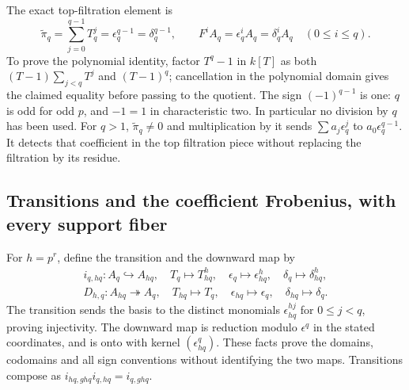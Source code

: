 The exact top-filtration element is
\begin{equation}\tag{CFP5}
 \widetilde\pi_q=\sum_{j=0}^{q-1}T_q^j
             =\epsilon_q^{q-1}=\delta_q^{q-1},\qquad
 F^iA_q=\epsilon_q^iA_q=\delta_q^iA_q\quad(0\le i\le q).
\end{equation}
To prove the polynomial identity, factor $T^q-1$ in
$k[T]$ as both $(T-1)\sum_{j<q}T^j$ and $(T-1)^q$;
cancellation in the polynomial domain gives the
claimed equality before passing to the quotient.
The sign $(-1)^{q-1}$ is one: $q$ is odd for odd $p$,
and $-1=1$ in characteristic two. In particular no
division by $q$ has been used. For $q>1$,
$\widetilde\pi_q\ne0$ and multiplication by it sends
$\sum a_j\epsilon_q^j$ to $a_0\epsilon_q^{q-1}$.
It detects that coefficient in the top filtration
piece without replacing the filtration by its residue.

\subsection{Transitions and the coefficient Frobenius, with every support fiber}

For $h=p^r$, define the transition and the downward map by
\begin{equation}\tag{CFP6}
\begin{gathered}
 i_{q,hq}:A_q\hookrightarrow A_{hq},\quad
      T_q\longmapsto T_{hq}^h,\quad
      \epsilon_q\longmapsto\epsilon_{hq}^h,\quad
      \delta_q\longmapsto\delta_{hq}^h,\\
 D_{h,q}:A_{hq}\twoheadrightarrow A_q,\quad
      T_{hq}\longmapsto T_q,\quad
      \epsilon_{hq}\longmapsto\epsilon_q,\quad
      \delta_{hq}\longmapsto\delta_q.
\end{gathered}
\end{equation}
The transition sends the basis to the distinct monomials
$\epsilon_{hq}^{hj}$ for $0\le j<q$, proving injectivity.
The downward map is reduction modulo $\epsilon^q$ in
the stated coordinates, and is onto with kernel
$(\epsilon_{hq}^q)$. These facts prove the domains,
codomains and all sign conventions without identifying
the two maps. Transitions compose as
$i_{hq,ghq}i_{q,hq}=i_{q,ghq}$.

